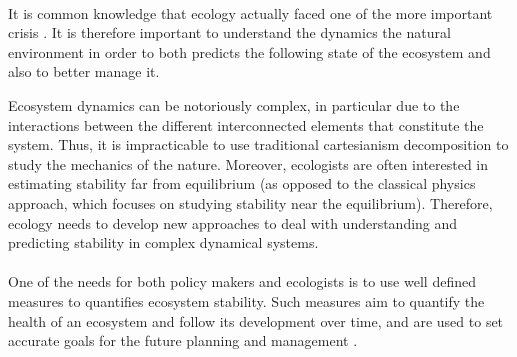 \documentclass{article}
\begin{document}
\paragraph{} %

It is common knowledge that ecology actually faced one of the more important crisis \cite{oosthoek_humanity_2005}.
It is therefore important to understand the dynamics the natural environment in order to both predicts the following state of the ecosystem and also to better manage it.

Ecosystem dynamics can be notoriously complex, in particular due to the interactions between the different interconnected elements that constitute the system. Thus, it is impracticable to use traditional cartesianism decomposition to study the mechanics of the nature.
Moreover, ecologists are often interested in estimating stability far from equilibrium (as opposed to the classical physics approach, which focuses on studying stability near the equilibrium). %
Therefore, ecology needs to develop new approaches to deal with understanding and predicting stability in complex dynamical systems. 



\paragraph{} %
One of the needs for both policy makers and ecologists is to use well defined measures to quantifies ecosystem stability. 
Such measures aim to quantify the health of an ecosystem and follow its development over time, and are used to set accurate goals for the future planning and management \cite{donohue_navigating_2016} \cite{mayer2008strengths}. 
\end{document}
